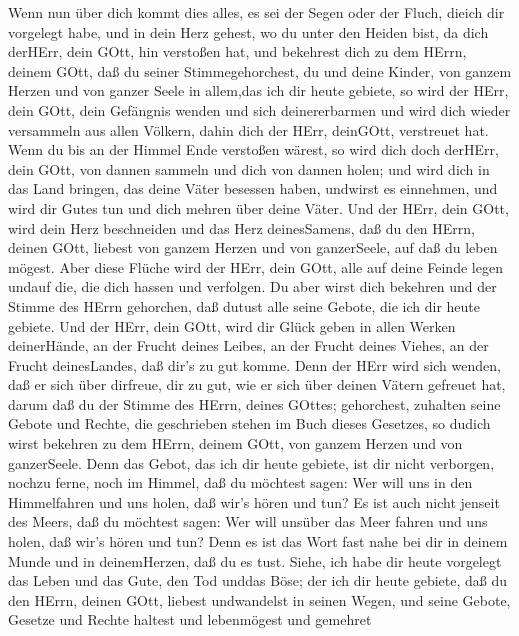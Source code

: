  Wenn nun über dich kommt dies alles, es sei der Segen oder
der Fluch, dieich dir vorgelegt habe, und in dein Herz gehest, wo du
unter den Heiden bist, da dich derHErr, dein GOtt, hin verstoßen hat,
 und bekehrest dich zu dem HErrn, deinem GOtt, daß du seiner
Stimmegehorchest, du und deine Kinder, von ganzem Herzen und von ganzer
Seele in allem,das ich dir heute gebiete,  so wird der HErr,
dein GOtt, dein Gefängnis wenden und sich deinererbarmen und wird dich
wieder versammeln aus allen Völkern, dahin dich der HErr, deinGOtt,
verstreuet hat.  Wenn du bis an der Himmel Ende verstoßen
wärest, so wird dich doch derHErr, dein GOtt, von dannen sammeln und
dich von dannen holen;  und wird dich in das Land bringen,
das deine Väter besessen haben, undwirst es einnehmen, und wird dir
Gutes tun und dich mehren über deine Väter.  Und der HErr,
dein GOtt, wird dein Herz beschneiden und das Herz deinesSamens, daß du
den HErrn, deinen GOtt, liebest von ganzem Herzen und von ganzerSeele,
auf daß du leben mögest.  Aber diese Flüche wird der HErr,
dein GOtt, alle auf deine Feinde legen undauf die, die dich hassen und
verfolgen.  Du aber wirst dich bekehren und der Stimme des
HErrn gehorchen, daß dutust alle seine Gebote, die ich dir heute
gebiete.  Und der HErr, dein GOtt, wird dir Glück geben in
allen Werken deinerHände, an der Frucht deines Leibes, an der Frucht
deines Viehes, an der Frucht deinesLandes, daß dir's zu gut komme. Denn
der HErr wird sich wenden, daß er sich über dirfreue, dir zu gut, wie er
sich über deinen Vätern gefreuet hat,  darum daß du der
Stimme des HErrn, deines GOttes; gehorchest, zuhalten seine Gebote und
Rechte, die geschrieben stehen im Buch dieses Gesetzes, so dudich wirst
bekehren zu dem HErrn, deinem GOtt, von ganzem Herzen und von
ganzerSeele.  Denn das Gebot, das ich dir heute gebiete,
ist dir nicht verborgen, nochzu ferne,  noch im Himmel, daß
du möchtest sagen: Wer will uns in den Himmelfahren und uns holen, daß
wir's hören und tun?  Es ist auch nicht jenseit des Meers,
daß du möchtest sagen: Wer will unsüber das Meer fahren und uns holen,
daß wir's hören und tun?  Denn es ist das Wort fast nahe
bei dir in deinem Munde und in deinemHerzen, daß du es tust.
 Siehe, ich habe dir heute vorgelegt das Leben und das
Gute, den Tod unddas Böse;  der ich dir heute gebiete, daß
du den HErrn, deinen GOtt, liebest undwandelst in seinen Wegen, und
seine Gebote, Gesetze und Rechte haltest und lebenmögest und gemehret
